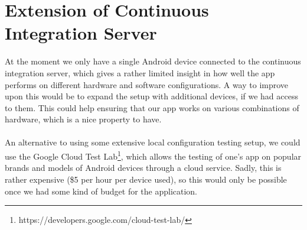 
\section{Extension of Continuous Integration Server}
\label{sec:extension_of_continuous_integration_server}

At the moment we only have a single Android device connected to the continuous integration server, which gives a rather limited insight in how well the app performs on different hardware and software configurations. A way to improve upon this would be to expand the setup with additional devices, if we had access to them. This could help ensuring that our app works on various combinations of hardware, which is a nice property to have. 
\\\\
An alternative to using some extensive local configuration testing setup, we could use the Google Cloud Test Lab\footnote{https://developers.google.com/cloud-test-lab/}, which allows the testing of one's app on popular brands and models of Android devices through a cloud service. Sadly, this is rather expensive (\$5 per hour per device used), so this would only be possible once we had some kind of budget for the application. 